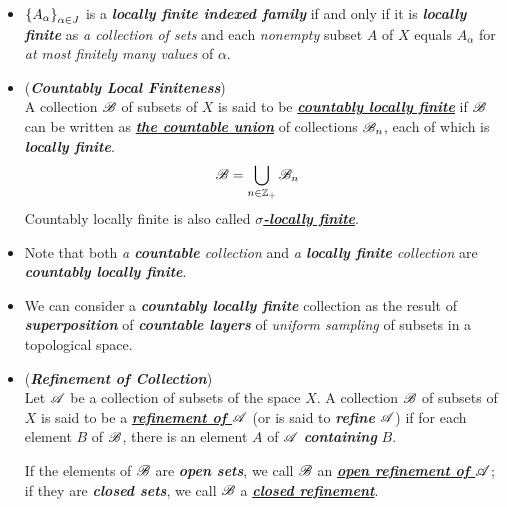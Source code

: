 \documentclass[11pt]{article}
\begin{document}
\begin{itemize}
\item \begin{remark}
$\left\{A_{\alpha}\right\}_{\alpha \in J}$ is a \emph{\textbf{locally finite indexed family}} if and only if it is \emph{\textbf{locally finite}} as \emph{a collection of sets} and each \emph{nonempty} subset $A$ of $X$ equals $A_{\alpha}$ for \emph{at most finitely many values} of $\alpha$.
\end{remark}

\item \begin{definition}  (\emph{\textbf{Countably Local Finiteness}})\\
A collection ${\mathscr B}$ of subsets of $X$ is said to be \underline{\emph{\textbf{countably locally finite}}} if ${\mathscr B}$ can be written as \underline{\emph{\textbf{the countable union}}} of collections ${\mathscr B}_n$, each of which is \emph{\textbf{locally finite}}. 
\begin{align*}
{\mathscr B} &= \bigcup_{n\in {\mathbb Z}_{+}}{\mathscr B}_{n}
\end{align*} Countably locally finite is also called \underline{\emph{\textbf{$\sigma$-locally finite}}}.
\end{definition}

\item \begin{remark}
Note that both \emph{a \textbf{countable} collection} and \emph{a \textbf{locally finite} collection} are \emph{\textbf{countably locally finite}}.
\end{remark}

\item \begin{remark}
We can consider a \emph{\textbf{countably locally finite}} collection as the result of \emph{\textbf{superposition}} of \emph{\textbf{countable layers}} of \emph{uniform sampling} of subsets in a topological space. 
\end{remark}

\item \begin{definition} (\textbf{\emph{Refinement of Collection}})\\
Let ${\mathscr A}$ be a collection of subsets of the space $X$. A collection ${\mathscr B}$ of subsets of $X$ is said to be a \underline{\emph{\textbf{refinement of ${\mathscr A}$}}} (or is said to \emph{\textbf{refine}} ${\mathscr A}$) if for each element $B$ of ${\mathscr B}$, there is an element $A$ of ${\mathscr A}$ \emph{\textbf{containing}} $B$. 

If the elements of ${\mathscr B}$ are \emph{\textbf{open sets}}, we call ${\mathscr B}$ an \underline{\emph{\textbf{open refinement of ${\mathscr A}$}}}; if they are \emph{\textbf{closed sets}}, we call ${\mathscr B}$ a \underline{\emph{\textbf{closed refinement}}}.
\end{definition}


\end{itemize}
\end{document}
